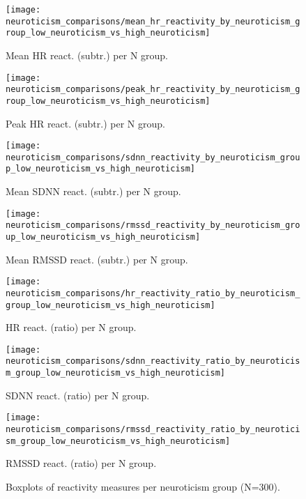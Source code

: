 \documentclass[11pt, a4paper]{report}
\begin{document}
\begin{figure}[H]
    \centering
    \begin{minipage}{0.48\textwidth}
        \texttt{[image: neuroticism\_comparisons/mean\_hr\_reactivity\_by\_neuroticism\_group\_low\_neuroticism\_vs\_high\_neuroticism]}
        \caption{Mean HR react. (subtr.) per N group.}
        \label{fig:boxplot_h1_start_results}
    \end{minipage}\hfill
    \begin{minipage}{0.48\textwidth}
        \texttt{[image: neuroticism\_comparisons/peak\_hr\_reactivity\_by\_neuroticism\_group\_low\_neuroticism\_vs\_high\_neuroticism]}
        \caption{Peak HR react. (subtr.) per N group.}
    \end{minipage}
    \vspace{\floatsep}
    \begin{minipage}{0.48\textwidth}
        \texttt{[image: neuroticism\_comparisons/sdnn\_reactivity\_by\_neuroticism\_group\_low\_neuroticism\_vs\_high\_neuroticism]}
        \caption{Mean SDNN react. (subtr.) per N group.}
    \end{minipage}\hfill
     \begin{minipage}{0.48\textwidth}
        \texttt{[image: neuroticism\_comparisons/rmssd\_reactivity\_by\_neuroticism\_group\_low\_neuroticism\_vs\_high\_neuroticism]}
        \caption{Mean RMSSD react. (subtr.) per N group.}
    \end{minipage}
    \vspace{\floatsep}
    \begin{minipage}{0.48\textwidth}
        \texttt{[image: neuroticism\_comparisons/hr\_reactivity\_ratio\_by\_neuroticism\_group\_low\_neuroticism\_vs\_high\_neuroticism]}
        \caption{HR react. (ratio) per N group.}
    \end{minipage}\hfill
    \begin{minipage}{0.48\textwidth}
        \texttt{[image: neuroticism\_comparisons/sdnn\_reactivity\_ratio\_by\_neuroticism\_group\_low\_neuroticism\_vs\_high\_neuroticism]}
        \caption{SDNN react. (ratio) per N group.}
     \end{minipage}
     \vspace{\floatsep}
     \begin{minipage}{0.48\textwidth}
        \texttt{[image: neuroticism\_comparisons/rmssd\_reactivity\_ratio\_by\_neuroticism\_group\_low\_neuroticism\_vs\_high\_neuroticism]}
        \caption{RMSSD react. (ratio) per N group.}
        \label{fig:boxplot_h1_end_results}
    \end{minipage}
    \caption{Boxplots of reactivity measures per neuroticism group (N=300).}
\end{figure}
\end{document}
